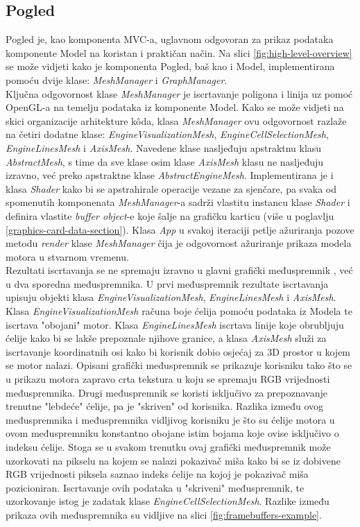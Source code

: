 \documentclass[times, utf8, diplomski]{fer}
\begin{document}
\subsection{Pogled} \label{view-section}
Pogled je, kao komponenta MVC-a, uglavnom odgovoran za prikaz podataka komponente Model na koristan i praktičan način. Na slici \ref{fig:high-level-overview} se može vidjeti kako je komponenta Pogled, baš kao i Model, implementirana pomoću dvije klase: \textit{MeshManager} i \textit{GraphManager}.\\

Ključna odgovornost klase \textit{MeshManager} je iscrtavanje poligona i linija uz pomoć OpenGL-a na temelju podataka iz komponente Model. Kako se može vidjeti na skici organizacije arhitekture k\^{o}da, klasa \textit{MeshManager} ovu odgovornost razlaže na četiri dodatne klase: \textit{EngineVisualizationMesh}, \textit{EngineCellSelectionMesh}, \textit{EngineLinesMesh} i \textit{AxisMesh}. Navedene klase nasljeđuju apstraktnu klasu \textit{AbstractMesh}, s time da sve klase osim klase \textit{AxisMesh} klasu ne nasljeđuju izravno, već preko apstraktne klase \textit{AbstractEngineMesh}.
Implementirana je i klasa \textit{Shader} kako bi se apstrahirale operacije vezane za sjenčare, pa svaka od spomenutih komponenata \textit{MeshManager}-a sadrži vlastitu instancu klase \textit{Shader} i definira vlastite \textit{buffer object}-e koje šalje na grafičku karticu (više u poglavlju \ref{graphics-card-data-section}). Klasa \textit{App} u svakoj iteraciji petlje ažuriranja pozove metodu \textit{render} klase \textit{MeshManager} čija je odgovornost ažuriranje prikaza modela motora u stvarnom vremenu.\\

Rezultati iscrtavanja se ne spremaju izravno u glavni grafički međuspremnik , već u dva sporedna međuspremnika. U prvi međuspremnik rezultate iscrtavanja upisuju objekti klasa \textit{EngineVisualizationMesh}, \textit{EngineLinesMesh} i \textit{AxisMesh}. Klasa \textit{EngineVisualizationMesh} računa boje ćelija pomoću podataka iz Modela te iscrtava "obojani" motor. Klasa \textit{EngineLinesMesh} iscrtava linije koje obrubljuju ćelije kako bi se lakše prepoznale njihove granice, a klasa \textit{AxisMesh} služi za iscrtavanje koordinatnih osi kako bi korisnik dobio osjećaj za 3D prostor u kojem se motor nalazi. Opisani grafički međuspremnik se prikazuje korisniku tako što se u prikazu motora zapravo crta tekstura u koju se spremaju RGB vrijednosti međuspremnika. Drugi međuspremnik se koristi isključivo za prepoznavanje trenutne "lebdeće" ćelije, pa je "skriven" od korisnika. Razlika između ovog međuspremnika i međuspremnika vidljivog korisniku je što su ćelije motora u ovom međuspremniku konstantno obojane istim bojama koje ovise isključivo o indeksu ćelije. Stoga se u svakom trenutku ovaj grafički međuspremnik može uzorkovati na pikselu na kojem se nalazi pokazivač miša kako bi se iz dobivene RGB vrijednosti piksela saznao indeks ćelije na kojoj je pokazivač miša pozicioniran. Iscrtavanje ovih podataka u "skriveni" međuspremnik, te uzorkovanje istog je zadatak klase \textit{EngineCellSelectionMesh}. Razlike između prikaza ovih međuspremnika su vidljive na slici \ref{fig:framebuffers-example}.
\end{document}
